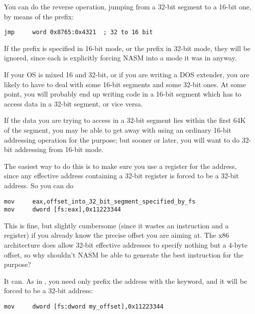 You can do the reverse operation, jumping from a 32-bit segment to a
16-bit one, by means of the  prefix:

\begin{lstlisting}
jmp     word 0x8765:0x4321  ; 32 to 16 bit
\end{lstlisting}

If the  prefix is specified in 16-bit mode, or the
 prefix in 32-bit mode, they will be ignored, since each is
explicitly forcing NASM into a mode it was in anyway.


If your OS is mixed 16 and 32-bit, or if you are writing a DOS
extender, you are likely to have to deal with some 16-bit segments
and some 32-bit ones. At some point, you will probably end up
writing code in a 16-bit segment which has to access data in a
32-bit segment, or vice versa.

If the data you are trying to access in a 32-bit segment lies within
the first 64K of the segment, you may be able to get away with using
an ordinary 16-bit addressing operation for the purpose; but sooner
or later, you will want to do 32-bit addressing from 16-bit mode.

The easiest way to do this is to make sure you use a register for
the address, since any effective address containing a 32-bit
register is forced to be a 32-bit address. So you can do

\begin{lstlisting}
mov     eax,offset_into_32_bit_segment_specified_by_fs
mov     dword [fs:eax],0x11223344
\end{lstlisting}

This is fine, but slightly cumbersome (since it wastes an
instruction and a register) if you already know the precise offset
you are aiming at. The x86 architecture does allow 32-bit effective
addresses to specify nothing but a 4-byte offset, so why shouldn't
NASM be able to generate the best instruction for the purpose?

It can. As in , you need only prefix the address
with the  keyword, and it will be forced to be a 32-bit
address:

\begin{lstlisting}
mov     dword [fs:dword my_offset],0x11223344
\end{lstlisting}

